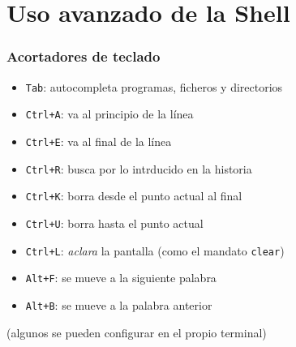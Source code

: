 \section{Uso avanzado de la Shell}


\begin{frame}
\frametitle{Acortadores de teclado}

\begin{itemize}
   \item \texttt{Tab}: autocompleta programas, ficheros y directorios
   \item \texttt{Ctrl+A}: va al principio de la línea
   \item \texttt{Ctrl+E}: va al final de la línea
   \item \texttt{Ctrl+R}: busca por lo intrducido en la historia
   \item \texttt{Ctrl+K}: borra desde el punto actual al final
   \item \texttt{Ctrl+U}: borra hasta el punto actual
   \item \texttt{Ctrl+L}: \emph{aclara} la pantalla (como el mandato \texttt{clear})
   \item \texttt{Alt+F}: se mueve a la siguiente palabra
   \item \texttt{Alt+B}: se mueve a la palabra anterior
\end{itemize}

(algunos se pueden configurar en el propio terminal)


\end{frame}



